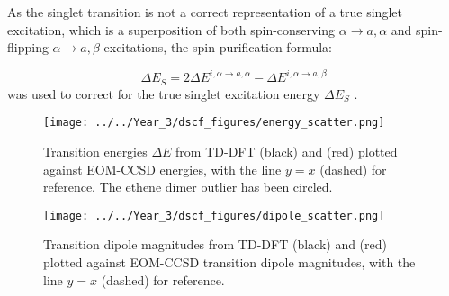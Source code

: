 As the \dscf singlet transition is not a correct representation of a true singlet
excitation, which is a superposition of both spin-conserving $\alpha \rightarrow a,
\alpha$ and spin-flipping $\alpha \rightarrow a, \beta$ excitations, the spin-purification 
formula:

\begin{equation}
\Delta E_S = 2\Delta E^{i,\alpha \rightarrow a, \alpha} - \Delta E^{i,\alpha \rightarrow a, \beta}
\end{equation}
%
was used to correct for the true singlet excitation energy $\Delta E_S$ \cite{Ziegler1977}.

\begin{figure}
\centering
\texttt{[image: ../../Year\_3/dscf\_figures/energy\_scatter.png]}
\caption{Transition energies $\Delta E$ from TD-DFT (black) and \dscf (red)
 plotted against EOM-CCSD energies, with the line $y=x$ (dashed) for reference.
 The ethene dimer outlier has been circled.}
\label{fig:energy_scatter}
\end{figure}

\begin{figure}
\centering
\texttt{[image: ../../Year\_3/dscf\_figures/dipole\_scatter.png]}
\caption{Transition dipole magnitudes from TD-DFT (black) and \dscf (red) plotted
against EOM-CCSD transition dipole magnitudes, with the line $y=x$ (dashed) for 
reference.}
\label{fig:dipole_scatter}
\end{figure}

